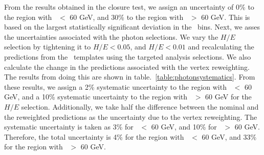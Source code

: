 From the results obtained in the closure test, we assign an uncertainty of 0\% to the region with \MET\ $<$ 60 GeV, and 
30\% to the region with \MET\ $>$ 60 GeV. This is based on the largest statistically significant deviation in the \MET\ bins.
Next, we asses the uncertainties associated with the photon selections. We vary the $H/E$ selection by tightening it to $H/E < 0.05$, 
and $H/E < 0.01$ and recalculating the predictions from the \MET\ templates using the targeted analysis selections. We also calculate
the change in the predictions associated with the vertex reweighting. The results from doing this are shown in table.~\ref{table:photonsystematics}.
 From these results, we assign a 2\% systematic uncertainty to the region with \MET\ $<$ 60 GeV, and a 10\% systematic uncertainty 
to the region with \MET\ $>$ 60 GeV for the $H/E$ selection. Additionally, we take half the difference between the nominal 
and the reweighted predictions as the uncertainty due to the vertex reweighting. The systematic uncertainty is taken as 3\% 
for \MET\ $<$ 60 GeV, and 10\% for \MET\ $>$ 60 GeV. Therefore, the total uncertainty is 4\% for the region with \MET\ $<$ 60 GeV, 
and 33\% for the region with \MET\ $>$ 60 GeV.

